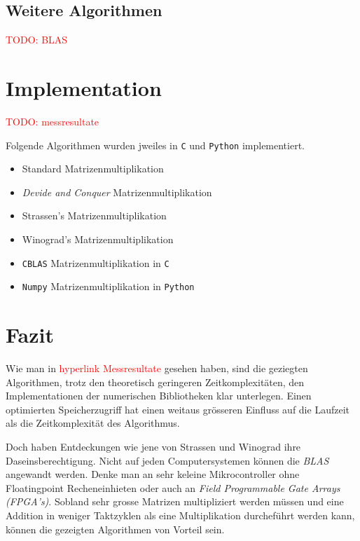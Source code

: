 \subsection{Weitere Algorithmen}

\textcolor{red}{TODO: BLAS}

\section{Implementation}
\textcolor{red}{TODO: messresultate}

Folgende Algorithmen wurden jweiles in \texttt{C} und \texttt{Python} implementiert.
\begin{itemize}
	\item Standard Matrizenmultiplikation
	\item \textit{Devide and Conquer} Matrizenmultiplikation
	\item Strassen's Matrizenmultiplikation
	\item Winograd's Matrizenmultiplikation
	\item \texttt{CBLAS} Matrizenmultiplikation in \texttt{C}
	\item \texttt{Numpy} Matrizenmultiplikation in \texttt{Python}
\end{itemize}

\section{Fazit}

Wie man in \textcolor{red}{hyperlink Messresultate} gesehen haben, sind die geziegten Algorithmen, trotz den theoretisch geringeren Zeitkomplexitäten, den Implementationen der numerischen Bibliotheken klar unterlegen.
Einen optimierten Speicherzugriff hat einen weitaus grösseren Einfluss auf die Laufzeit als die Zeitkomplexität des Algorithmus.

Doch haben Entdeckungen wie jene von Strassen und Winograd ihre Daseinsberechtigung.
Nicht auf jeden Computersystemen können die \textit{BLAS} angewandt werden.
Denke man an sehr keleine Mikrocontroller ohne Floatingpoint Recheneinhieten oder auch an \textit{Field Programmable Gate Arrays (FPGA's)}.
Sobland sehr grosse Matrizen multipliziert werden müssen und eine Addition in weniger Taktzyklen als eine Multiplikation durcheführt werden kann, können die gezeigten Algorithmen von Vorteil sein.
